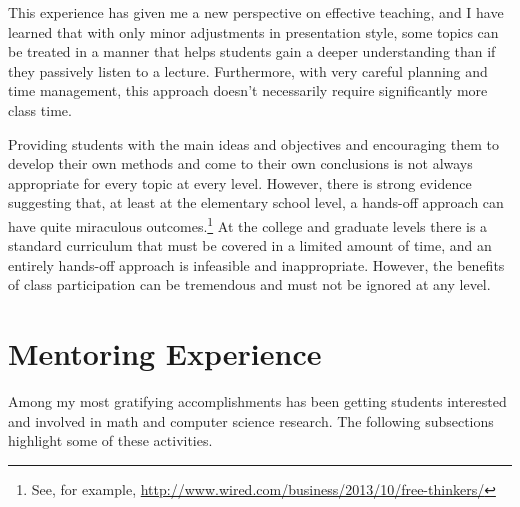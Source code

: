 This experience has given me a new perspective on effective teaching, and I have learned that with only minor adjustments in presentation style, some topics can be treated in a manner that helps students gain a deeper understanding than if they passively listen to a lecture. Furthermore, with very careful planning and time management, this approach doesn't necessarily require significantly more class time.

Providing students with the main ideas and objectives and encouraging them to develop their own methods and come to their own conclusions is not always appropriate for every topic at every level.  However, there is strong evidence suggesting that, at least at the elementary school level, a hands-off approach can have quite miraculous outcomes.\footnote{See, for example, \url{http://www.wired.com/business/2013/10/free-thinkers/}} At the college and graduate levels there is a standard curriculum that must be covered in a limited amount of time, and an entirely hands-off approach is infeasible and inappropriate.  However, the benefits of class participation can be tremendous and must not be ignored at any level.


\newpage


\section{Mentoring Experience}
Among my most gratifying accomplishments has been getting students interested and involved in math and computer science research. The following subsections highlight some of these activities.

\pagestyle{fancy}\chead{} 
 \lfoot{} \rfoot{\thepage} \cfoot{}

\newcommand{\advisee}[1]{\textbf{#1}}

